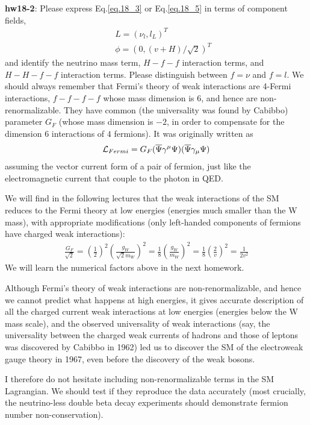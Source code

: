 \documentclass[12pt]{article}
\begin{document}
{\bf hw18-2}: Please express Eq.\ref{eq.18_3} or Eq.\ref{eq.18_5} in terms of component fields,
\begin{eqnarray}
    && L = (\nu_l, l_L)^T \label{eq.18_8a}\\
    && \phi = (0, (v+H)/\sqrt{2})^T \label{eq.18_8b}
\end{eqnarray}
and identify the neutrino mass term, $H-f-f$ interaction terms, and
$H-H-f-f$ interaction terms. Please distinguish between $f = \nu$ and $f=l$.
We should always remember that Fermi's theory of weak interactions
are 4-Fermi interactions,
$f-f-f-f$
whose mass dimension is $6$, and hence are non-renormalizable.  They have
common (the universality was found by Cabibbo) parameter $G_F$ (whose mass
dimension is $-2$, in order to compensate for the dimension 6 interactions
of $4$ fermions). It was originally written as
\begin{eqnarray}
    {\cal L}_{Fermi}
= G_F ({\overline \Psi} \gamma^\mu \Psi) ({\overline \Psi} \gamma_\mu \Psi) \label{eq.18_9}
\end{eqnarray}
assuming the vector current form of a pair of fermion, just like the
electromagnetic current that couple to the photon in QED.

We will find in the following lectures that the weak interactions
of the SM reduces to the Fermi theory at low energies (energies much
smaller than the W mass), with appropriate modifications (only
left-handed components of fermions have charged weak interactions):
\begin{eqnarray}
    \frac{G_F}{\sqrt{2}}=\left(\frac{1}{2}\right)^2 \left(\frac{g_W}{{\sqrt 2}m_W}\right)^2 =\frac{1}{8} \left(\frac{g_W}{m_W}\right)^2 =\frac{1}{8} \left(\frac{2}{v}\right)^2 =\frac{1}{2v^2} \label{eq.18_10}
\end{eqnarray}
We will learn the numerical factors above in the next homework.

Although Fermi's theory of weak interactions are non-renormalizable,
and hence we cannot predict what happens at high energies, it gives
accurate description of all the charged current weak interactions at low
energies (energies below the W mass scale), and the observed
universality of weak interactions (say, the universality between the
charged weak currents of hadrons and those of leptons was discovered
by Cabibbo in 1962) led us to discover the SM of the electroweak
gauge theory in 1967, even before the discovery of the weak bosons.

I therefore do not hesitate including non-renormalizable terms in the
SM Lagrangian.  We should test if they reproduce the data accurately
(most crucially, the neutrino-less double beta decay experiments
should demonstrate fermion number non-conservation).
\end{document}

